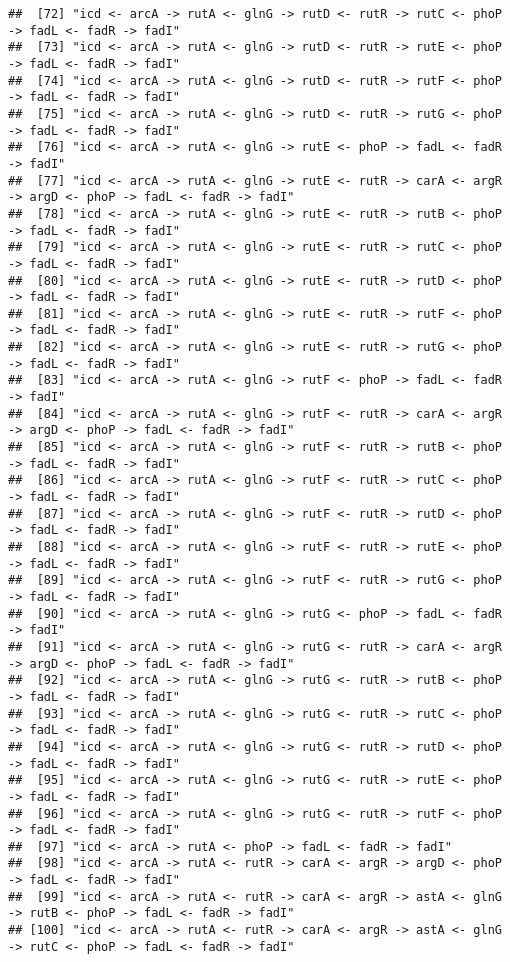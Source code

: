 \documentclass[
]{article}
\begin{document}
\begin{verbatim}
##  [72] "icd <- arcA -> rutA <- glnG -> rutD <- rutR -> rutC <- phoP -> fadL <- fadR -> fadI"                
##  [73] "icd <- arcA -> rutA <- glnG -> rutD <- rutR -> rutE <- phoP -> fadL <- fadR -> fadI"                
##  [74] "icd <- arcA -> rutA <- glnG -> rutD <- rutR -> rutF <- phoP -> fadL <- fadR -> fadI"                
##  [75] "icd <- arcA -> rutA <- glnG -> rutD <- rutR -> rutG <- phoP -> fadL <- fadR -> fadI"                
##  [76] "icd <- arcA -> rutA <- glnG -> rutE <- phoP -> fadL <- fadR -> fadI"                                
##  [77] "icd <- arcA -> rutA <- glnG -> rutE <- rutR -> carA <- argR -> argD <- phoP -> fadL <- fadR -> fadI"
##  [78] "icd <- arcA -> rutA <- glnG -> rutE <- rutR -> rutB <- phoP -> fadL <- fadR -> fadI"                
##  [79] "icd <- arcA -> rutA <- glnG -> rutE <- rutR -> rutC <- phoP -> fadL <- fadR -> fadI"                
##  [80] "icd <- arcA -> rutA <- glnG -> rutE <- rutR -> rutD <- phoP -> fadL <- fadR -> fadI"                
##  [81] "icd <- arcA -> rutA <- glnG -> rutE <- rutR -> rutF <- phoP -> fadL <- fadR -> fadI"                
##  [82] "icd <- arcA -> rutA <- glnG -> rutE <- rutR -> rutG <- phoP -> fadL <- fadR -> fadI"                
##  [83] "icd <- arcA -> rutA <- glnG -> rutF <- phoP -> fadL <- fadR -> fadI"                                
##  [84] "icd <- arcA -> rutA <- glnG -> rutF <- rutR -> carA <- argR -> argD <- phoP -> fadL <- fadR -> fadI"
##  [85] "icd <- arcA -> rutA <- glnG -> rutF <- rutR -> rutB <- phoP -> fadL <- fadR -> fadI"                
##  [86] "icd <- arcA -> rutA <- glnG -> rutF <- rutR -> rutC <- phoP -> fadL <- fadR -> fadI"                
##  [87] "icd <- arcA -> rutA <- glnG -> rutF <- rutR -> rutD <- phoP -> fadL <- fadR -> fadI"                
##  [88] "icd <- arcA -> rutA <- glnG -> rutF <- rutR -> rutE <- phoP -> fadL <- fadR -> fadI"                
##  [89] "icd <- arcA -> rutA <- glnG -> rutF <- rutR -> rutG <- phoP -> fadL <- fadR -> fadI"                
##  [90] "icd <- arcA -> rutA <- glnG -> rutG <- phoP -> fadL <- fadR -> fadI"                                
##  [91] "icd <- arcA -> rutA <- glnG -> rutG <- rutR -> carA <- argR -> argD <- phoP -> fadL <- fadR -> fadI"
##  [92] "icd <- arcA -> rutA <- glnG -> rutG <- rutR -> rutB <- phoP -> fadL <- fadR -> fadI"                
##  [93] "icd <- arcA -> rutA <- glnG -> rutG <- rutR -> rutC <- phoP -> fadL <- fadR -> fadI"                
##  [94] "icd <- arcA -> rutA <- glnG -> rutG <- rutR -> rutD <- phoP -> fadL <- fadR -> fadI"                
##  [95] "icd <- arcA -> rutA <- glnG -> rutG <- rutR -> rutE <- phoP -> fadL <- fadR -> fadI"                
##  [96] "icd <- arcA -> rutA <- glnG -> rutG <- rutR -> rutF <- phoP -> fadL <- fadR -> fadI"                
##  [97] "icd <- arcA -> rutA <- phoP -> fadL <- fadR -> fadI"                                                
##  [98] "icd <- arcA -> rutA <- rutR -> carA <- argR -> argD <- phoP -> fadL <- fadR -> fadI"                
##  [99] "icd <- arcA -> rutA <- rutR -> carA <- argR -> astA <- glnG -> rutB <- phoP -> fadL <- fadR -> fadI"
## [100] "icd <- arcA -> rutA <- rutR -> carA <- argR -> astA <- glnG -> rutC <- phoP -> fadL <- fadR -> fadI"
\end{verbatim}
\end{document}
